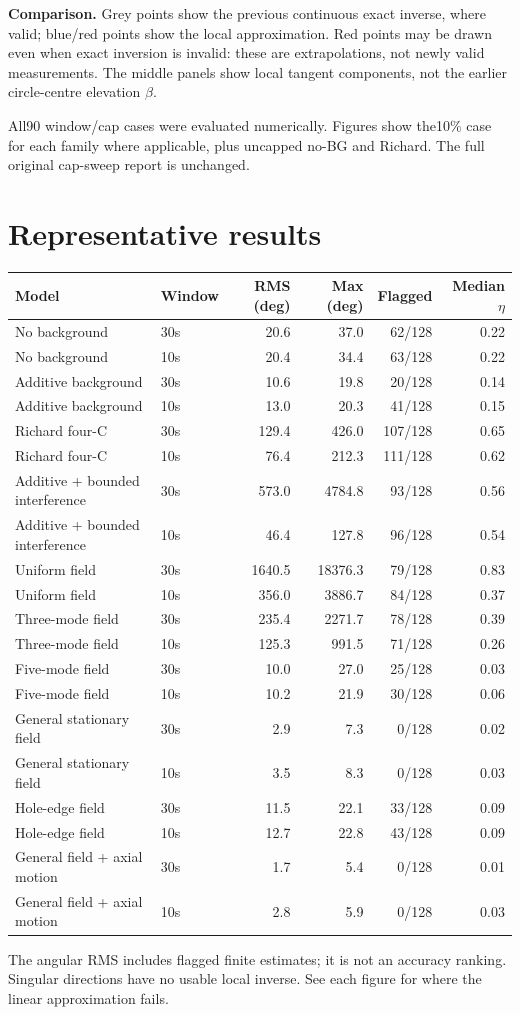\documentclass[10pt,a4paper]{article}
\begin{document}
\textbf{Comparison.} Grey points show the previous continuous exact inverse, where valid; blue/red points show the local approximation. Red points may be drawn even when exact inversion is invalid: these are extrapolations, not newly valid measurements. The middle panels show local tangent components, not the earlier circle-centre elevation $\beta$.

All90 window/cap cases were evaluated numerically. Figures show the10\% case for each family where applicable, plus uncapped no-BG and Richard. The full original cap-sweep report is unchanged.
\newpage
\section*{Representative results}
\begin{longtable}{llrrrr}\toprule
Model & Window & RMS (deg) & Max (deg) & Flagged & Median $\eta$\\\midrule\endhead
No background & 30s & 20.6 & 37.0 & 62/128 & 0.22\\
No background & 10s & 20.4 & 34.4 & 63/128 & 0.22\\
Additive background & 30s & 10.6 & 19.8 & 20/128 & 0.14\\
Additive background & 10s & 13.0 & 20.3 & 41/128 & 0.15\\
Richard four-C & 30s & 129.4 & 426.0 & 107/128 & 0.65\\
Richard four-C & 10s & 76.4 & 212.3 & 111/128 & 0.62\\
Additive + bounded interference & 30s & 573.0 & 4784.8 & 93/128 & 0.56\\
Additive + bounded interference & 10s & 46.4 & 127.8 & 96/128 & 0.54\\
Uniform field & 30s & 1640.5 & 18376.3 & 79/128 & 0.83\\
Uniform field & 10s & 356.0 & 3886.7 & 84/128 & 0.37\\
Three-mode field & 30s & 235.4 & 2271.7 & 78/128 & 0.39\\
Three-mode field & 10s & 125.3 & 991.5 & 71/128 & 0.26\\
Five-mode field & 30s & 10.0 & 27.0 & 25/128 & 0.03\\
Five-mode field & 10s & 10.2 & 21.9 & 30/128 & 0.06\\
General stationary field & 30s & 2.9 & 7.3 & 0/128 & 0.02\\
General stationary field & 10s & 3.5 & 8.3 & 0/128 & 0.03\\
Hole-edge field & 30s & 11.5 & 22.1 & 33/128 & 0.09\\
Hole-edge field & 10s & 12.7 & 22.8 & 43/128 & 0.09\\
General field + axial motion & 30s & 1.7 & 5.4 & 0/128 & 0.01\\
General field + axial motion & 10s & 2.8 & 5.9 & 0/128 & 0.03\\
\bottomrule\end{longtable} The angular RMS includes flagged finite estimates; it is not an accuracy ranking. Singular directions have no usable local inverse. See each figure for where the linear approximation fails.
\end{document}
